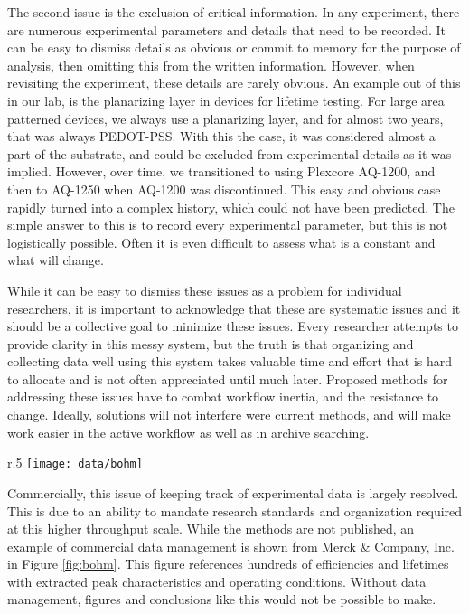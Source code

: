\documentclass[../thesis.tex]{subfiles}
\begin{document}
The second issue is the exclusion of critical information.  
In any experiment, there are numerous experimental parameters and details that need to be recorded. 
It can be easy to dismiss details as obvious or commit to memory for the purpose of analysis, then omitting this from the written information.
However, when revisiting the experiment, these details are rarely obvious.
An example out of this in our lab, is the planarizing layer in devices for lifetime testing.
For large area patterned devices, we always use a planarizing layer, and for almost two years, that was always PEDOT-PSS.
With this the case, it was considered almost a part of the substrate, and could be excluded from experimental details as it was implied.
However, over time, we transitioned to using Plexcore AQ-1200, and then to AQ-1250 when AQ-1200 was discontinued.
This easy and obvious case rapidly turned into a complex history, which could not have been predicted.
The simple answer to this is to record every experimental parameter, but this is not logistically possible.
Often it is even difficult to assess what is a constant and what will change.

While it can be easy to dismiss these issues as a problem for individual researchers, it is important to acknowledge that these are systematic issues and it should be a collective goal to minimize these issues.
Every researcher attempts to provide clarity in this messy system, but the truth is that organizing and collecting data well using this system takes valuable time and effort that is hard to allocate and is not often appreciated until much later.
Proposed methods for addressing these issues have to combat workflow inertia, and the resistance to change.
Ideally, solutions will not interfere were current methods, and will make work easier in the active workflow as well as in archive searching.

\begin{wrapfigure}{r}{.5\textwidth}
\centering
\texttt{[image: data/bohm]}
\caption{Dependence of \eqe (red) and lifetime (black) on the driving voltage for various ETL configurations, sharing same HTL and EML. Reproduced from \textcite{Bohm2011}.}
\label{fig:bohm}
\end{wrapfigure}

Commercially, this issue of keeping track of experimental data is largely resolved.
This is due to an ability to mandate research standards and organization required at this higher throughput scale.
While the methods are not published, an example of commercial data management is shown from Merck \& Company, Inc. in Figure \ref{fig:bohm}.
This figure references hundreds of efficiencies and lifetimes with extracted peak \eqe characteristics and operating conditions.
Without data management, figures and conclusions like this would not be possible to make.
\end{document}
